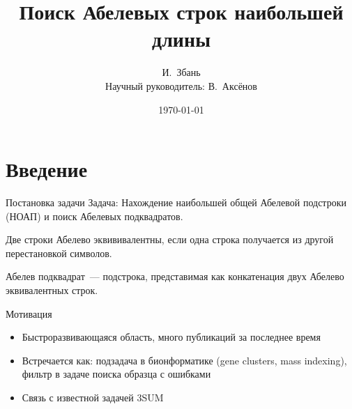 \documentclass[hyperref=unicode,graphics=pdflatex,12pt]{beamer}
\begin{document}
\title{Поиск Абелевых строк наибольшей длины}
\author{И.~Збань\\
Научный руководитель: В.~Аксёнов}

\date{\today}
\frame{\titlepage}                                   

\section{Введение}

\begin{frame}{Постановка задачи}
Задача: Нахождение наибольшей общей Абелевой подстроки (НОАП) и поиск Абелевых подквадратов.

\vspace{0.5cm}
\begin{definition}
Две строки Абелево эквививалентны, если одна строка получается из другой перестановкой символов.
\end{definition}

\begin{definition}
Абелев подквадрат~--- подстрока, представимая как конкатенация двух Абелево эквивалентных строк.
\end{definition}
\end{frame}


\begin{frame}{Мотивация}
\hspace{0.5cm}
\begin{itemize}
\item<1-> Быстроразвивающаяся область, много публикаций за последнее время
\item<2-> Встречается как: подзадача в бионформатике (gene clusters, mass indexing),
  фильтр в задаче поиска образца с ошибками
\item<3-> Связь с известной задачей 3SUM
\end{itemize}
\end{frame}
\end{document}
